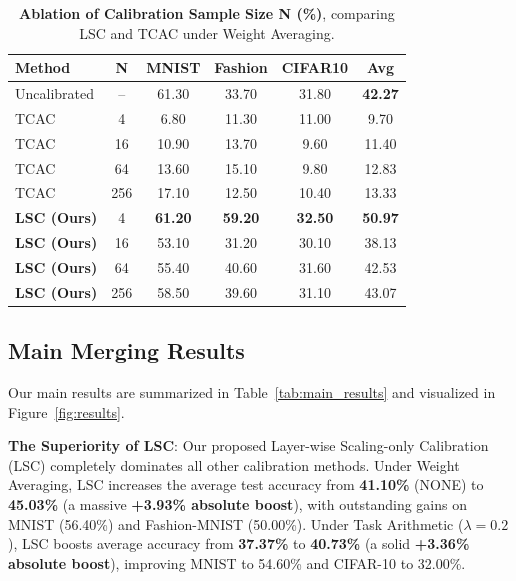 \documentclass{article}
\theoremstyle{plain}
\theoremstyle{definition}
\theoremstyle{remark}
\begin{document}
\begin{table}[t]
\caption{\textbf{Ablation of Calibration Sample Size N (\%)}, comparing LSC and TCAC under Weight Averaging.}
\label{tab:sample_size_results}
\vskip 0.05in
\begin{center}
\begin{small}
\begin{sc}
\setlength{\tabcolsep}{3.5pt}
\begin{tabular}{lccccc}
\toprule
Method & N & MNIST & Fashion & CIFAR10 & \textbf{Avg} \\
\midrule
Uncalibrated & -- & 61.30 & 33.70 & 31.80 & \textbf{42.27} \\
\midrule
TCAC & 4 & 6.80 & 11.30 & 11.00 & 9.70 \\
TCAC & 16 & 10.90 & 13.70 & 9.60 & 11.40 \\
TCAC & 64 & 13.60 & 15.10 & 9.80 & 12.83 \\
TCAC & 256 & 17.10 & 12.50 & 10.40 & 13.33 \\
\midrule
\textbf{LSC (Ours)} & 4 & \textbf{61.20} & \textbf{59.20} & \textbf{32.50} & \textbf{50.97} \\
\textbf{LSC (Ours)} & 16 & 53.10 & 31.20 & 30.10 & 38.13 \\
\textbf{LSC (Ours)} & 64 & 55.40 & 40.60 & 31.60 & 42.53 \\
\textbf{LSC (Ours)} & 256 & 58.50 & 39.60 & 31.10 & 43.07 \\
\bottomrule
\end{tabular}
\end{sc}
\end{small}
\end{center}
\vspace{-10pt}
\vskip -0.15in
\end{table}

\subsection{Main Merging Results}
Our main results are summarized in Table~\ref{tab:main_results} and visualized in Figure~\ref{fig:results}.

\textbf{The Superiority of LSC}: Our proposed Layer-wise Scaling-only Calibration (LSC) completely dominates all other calibration methods. Under Weight Averaging, LSC increases the average test accuracy from \textbf{41.10\%} (NONE) to \textbf{45.03\%} (a massive \textbf{+3.93\% absolute boost}), with outstanding gains on MNIST (56.40\%) and Fashion-MNIST (50.00\%). Under Task Arithmetic ($\lambda = 0.2$), LSC boosts average accuracy from \textbf{37.37\%} to \textbf{40.73\%} (a solid \textbf{+3.36\% absolute boost}), improving MNIST to 54.60\% and CIFAR-10 to 32.00\%.
\end{document}
